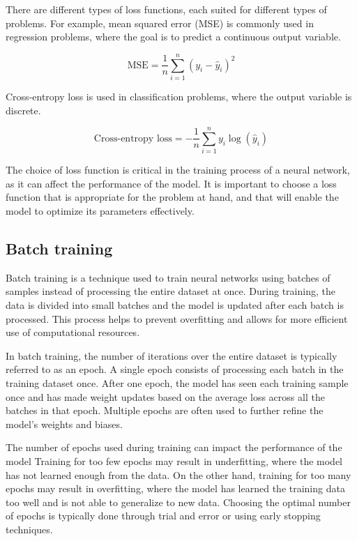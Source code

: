 There are different types of loss functions, each suited for different types of problems. For example, mean squared error (MSE) is commonly used in regression problems, where the goal is to predict a continuous output variable.

\begin{equation}
  \text{MSE} = \frac{1}{n} \sum_{i=1}^{n} (y_i - \hat{y}_i)^2
\end{equation}

Cross-entropy loss is used in classification problems, where the output variable is discrete.

\begin{equation}
  \text{Cross-entropy loss} = - \frac{1}{n} \sum_{i=1}^{n} y_i \log(\hat{y}_i)
\end{equation}

The choice of loss function is critical in the training process of a neural network, as it can affect the performance of the model. 
It is important to choose a loss function that is appropriate for the problem at hand, and that will enable the model to optimize its parameters effectively.

\subsection{Batch training}
Batch training is a technique used to train neural networks using batches of samples instead of processing the entire dataset at once. 
During training, the data is divided into small batches and the model is updated after each batch is processed. 
This process helps to prevent overfitting and allows for more efficient use of computational resources.

In batch training, the number of iterations over the entire dataset is typically referred to as an epoch. 
A single epoch consists of processing each batch in the training dataset once. 
After one epoch, the model has seen each training sample once and has made weight updates based on the average loss across all the batches in that epoch.
Multiple epochs are often used to further refine the model's weights and biases.

The number of epochs used during training can impact the performance of the model
Training for too few epochs may result in underfitting, where the model has not learned enough from the data. 
On the other hand, training for too many epochs may result in overfitting, where the model has learned the training data too well and is not able to generalize to new data. 
Choosing the optimal number of epochs is typically done through trial and error or using early stopping techniques.

